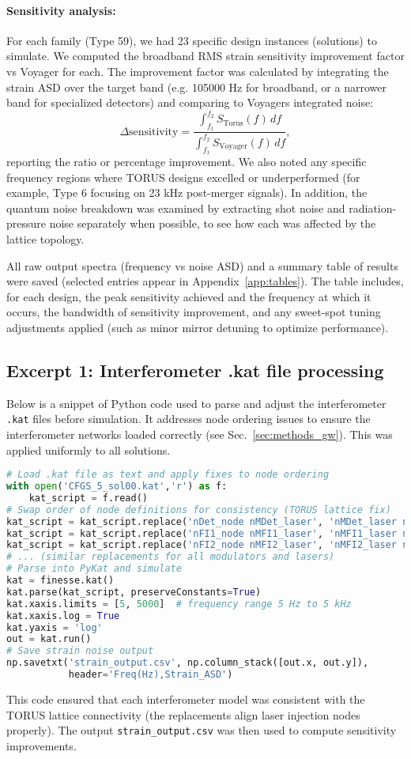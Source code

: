 \documentclass{article}
\begin{document}
\paragraph{Sensitivity analysis:} For each family (Type 59), we had 23 specific design instances (solutions) to simulate. We computed the broadband RMS strain sensitivity improvement factor vs Voyager for each. The improvement factor was calculated by integrating the strain ASD over the target band (e.g. 105000 Hz for broadband, or a narrower band for specialized detectors) and comparing to Voyagers integrated noise:
\[ \Delta \text{sensitivity} = \frac{\int_{f_1}^{f_2} S_{\text{Torus}}(f)\,df}{\int_{f_1}^{f_2} S_{\text{Voyager}}(f)\,df}, \] 
reporting the ratio or percentage improvement. We also noted any specific frequency regions where TORUS designs excelled or underperformed (for example, Type 6 focusing on 23 kHz post-merger signals). In addition, the quantum noise breakdown was examined by extracting shot noise and radiation-pressure noise separately when possible, to see how each was affected by the lattice topology.

All raw output spectra (frequency vs noise ASD) and a summary table of results were saved (selected entries appear in Appendix~\ref{app:tables}). The table includes, for each design, the peak sensitivity achieved and the frequency at which it occurs, the bandwidth of sensitivity improvement, and any sweet-spot tuning adjustments applied (such as minor mirror detuning to optimize performance).

\subsection*{Excerpt 1: Interferometer .kat file processing}
Below is a snippet of Python code used to parse and adjust the interferometer \texttt{.kat} files before simulation. It addresses node ordering issues to ensure the interferometer networks loaded correctly (see Sec.~\ref{sec:methods_gw}). This was applied uniformly to all solutions.
\begin{lstlisting}[language=Python]
# Load .kat file as text and apply fixes to node ordering
with open('CFGS_5_sol00.kat','r') as f:
    kat_script = f.read()
# Swap order of node definitions for consistency (TORUS lattice fix)
kat_script = kat_script.replace('nDet_node nMDet_laser', 'nMDet_laser nDet_node')
kat_script = kat_script.replace('nFI1_node nMFI1_laser', 'nMFI1_laser nFI1_node')
kat_script = kat_script.replace('nFI2_node nMFI2_laser', 'nMFI2_laser nFI2_node')
# ... (similar replacements for all modulators and lasers)
# Parse into PyKat and simulate
kat = finesse.kat()
kat.parse(kat_script, preserveConstants=True)
kat.xaxis.limits = [5, 5000]  # frequency range 5 Hz to 5 kHz
kat.xaxis.log = True
kat.yaxis = 'log'
out = kat.run()
# Save strain noise output
np.savetxt('strain_output.csv', np.column_stack([out.x, out.y]), 
           header='Freq(Hz),Strain_ASD')
\end{lstlisting}
This code ensured that each interferometer model was consistent with the TORUS lattice connectivity (the replacements align laser injection nodes properly). The output \texttt{strain\_output.csv} was then used to compute sensitivity improvements.
\end{document}
